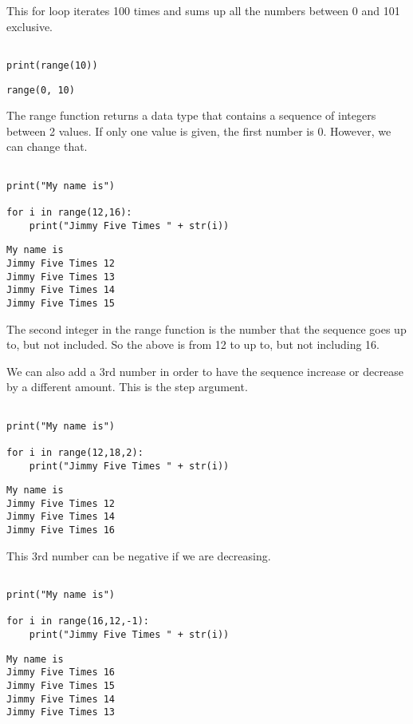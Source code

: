 \documentclass[11pt]{article}
\begin{document}
This for loop iterates 100 times and sums up all the numbers between 0 and 101 exclusive.


\begin{verbatim}

print(range(10))

\end{verbatim}

\begin{verbatim}
range(0, 10)
\end{verbatim}


The range function returns a data type that contains a sequence of integers between 2 values. If only one value is given, the first number is 0. However, we can change that.

\begin{verbatim}

print("My name is")

for i in range(12,16):
    print("Jimmy Five Times " + str(i))

\end{verbatim}

\begin{verbatim}
My name is
Jimmy Five Times 12
Jimmy Five Times 13
Jimmy Five Times 14
Jimmy Five Times 15
\end{verbatim}


The second integer in the range function is the number that the sequence goes up to, but not included. So the above is from 12 to up to, but not including 16.

We can also add a 3rd number in order to have the sequence increase or decrease by a different amount. This is the step argument.


\begin{verbatim}

print("My name is")

for i in range(12,18,2):
    print("Jimmy Five Times " + str(i))

\end{verbatim}

\begin{verbatim}
My name is
Jimmy Five Times 12
Jimmy Five Times 14
Jimmy Five Times 16
\end{verbatim}


This 3rd number can be negative if we are decreasing.


\begin{verbatim}

print("My name is")

for i in range(16,12,-1):
    print("Jimmy Five Times " + str(i))

\end{verbatim}

\begin{verbatim}
My name is
Jimmy Five Times 16
Jimmy Five Times 15
Jimmy Five Times 14
Jimmy Five Times 13
\end{verbatim}
\end{document}
